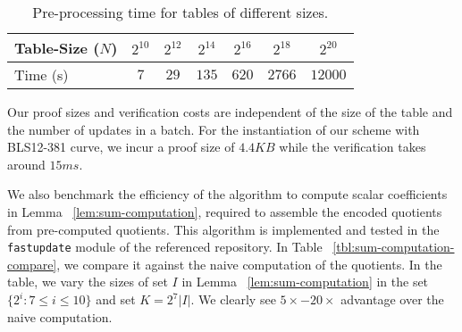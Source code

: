 \begin{table}[htbp]
    \begin{tabular}{|l|c|c|c|c|c|c|}
        \hline
        \cellcolor{lightgray} Table-Size ($N$) & $2^{10}$ & $2^{12}$ & $2^{14}$ & $2^{16}$ & $2^{18}$ & $2^{20}$ \\ \hline
        \cellcolor{lightgray} Time (s) & $7$ & $29$ & $135$ & $620$ & $2766$ & $12000$ \\ \hline
    \end{tabular}
    \caption{Pre-processing time for tables of different sizes.}
    \label{tbl:offline-proving-time}
    \vspace*{-5mm}
\end{table}


 Our proof sizes and verification costs are independent of the
size of the table and the number of updates in a batch. For the instantiation of our scheme with BLS12-381 curve,
we incur a proof size of $4.4KB$ while the verification takes around $15ms$.

 We also benchmark the efficiency of the algorithm to compute
 scalar coefficients in Lemma ~\ref{lem:sum-computation}, required to assemble the encoded quotients from pre-computed quotients.
This algorithm is implemented and tested in the {\tt fastupdate} module of the referenced repository.
In Table ~\ref{tbl:sum-computation-compare}, we compare it against the naive computation of the quotients.
In the table, we vary the sizes of set $I$ in Lemma ~\ref{lem:sum-computation} in the set $\{2^i:7\leq i\leq 10\}$
and set $K=2^7|I|$. %
We clearly see $5\times-20\times$ advantage over the naive computation.

